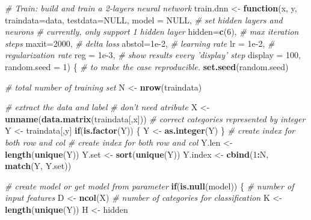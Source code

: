 \documentclass[]{book}
\newenvironment{Shaded}{\begin{snugshade}}{\end{snugshade}}
\newcommand{\CommentTok}[1]{\textcolor[rgb]{0.56,0.35,0.01}{\textit{#1}}}
\newcommand{\ControlFlowTok}[1]{\textcolor[rgb]{0.13,0.29,0.53}{\textbf{#1}}}
\newcommand{\DataTypeTok}[1]{\textcolor[rgb]{0.13,0.29,0.53}{#1}}
\newcommand{\DecValTok}[1]{\textcolor[rgb]{0.00,0.00,0.81}{#1}}
\newcommand{\FloatTok}[1]{\textcolor[rgb]{0.00,0.00,0.81}{#1}}
\newcommand{\KeywordTok}[1]{\textcolor[rgb]{0.13,0.29,0.53}{\textbf{#1}}}
\newcommand{\NormalTok}[1]{#1}
\newcommand{\OperatorTok}[1]{\textcolor[rgb]{0.81,0.36,0.00}{\textbf{#1}}}
\newcommand{\OtherTok}[1]{\textcolor[rgb]{0.56,0.35,0.01}{#1}}
\newcommand{\StringTok}[1]{\textcolor[rgb]{0.31,0.60,0.02}{#1}}
\begin{document}
\begin{Shaded}
\begin{Highlighting}[]
{{\CommentTok{# Train: build and train a 2-layers neural network }
\NormalTok{train.dnn <-}\StringTok{ }\ControlFlowTok{function}\NormalTok{(x, y, }\DataTypeTok{traindata=}\NormalTok{data, }\DataTypeTok{testdata=}\OtherTok{NULL}\NormalTok{,}
                  \DataTypeTok{model =} \OtherTok{NULL}\NormalTok{,}
                  \CommentTok{# set hidden layers and neurons}
                  \CommentTok{# currently, only support 1 hidden layer}
                  \DataTypeTok{hidden=}\KeywordTok{c}\NormalTok{(}\DecValTok{6}\NormalTok{), }
                  \CommentTok{# max iteration steps}
                  \DataTypeTok{maxit=}\DecValTok{2000}\NormalTok{,}
                  \CommentTok{# delta loss }
                  \DataTypeTok{abstol=}\FloatTok{1e-2}\NormalTok{,}
                  \CommentTok{# learning rate}
                  \DataTypeTok{lr =} \FloatTok{1e-2}\NormalTok{,}
                  \CommentTok{# regularization rate}
                  \DataTypeTok{reg =} \FloatTok{1e-3}\NormalTok{,}
                  \CommentTok{# show results every 'display' step}
                  \DataTypeTok{display =} \DecValTok{100}\NormalTok{,}
                  \DataTypeTok{random.seed =} \DecValTok{1}\NormalTok{)}
\NormalTok{\{}
  \CommentTok{# to make the case reproducible.}
  \KeywordTok{set.seed}\NormalTok{(random.seed)}
  
  \CommentTok{# total number of training set}
\NormalTok{  N <-}\StringTok{ }\KeywordTok{nrow}\NormalTok{(traindata)}
  
  \CommentTok{# extract the data and label}
  \CommentTok{# don't need atribute }
\NormalTok{  X <-}\StringTok{ }\KeywordTok{unname}\NormalTok{(}\KeywordTok{data.matrix}\NormalTok{(traindata[,x]))}
  \CommentTok{# correct categories represented by integer }
\NormalTok{  Y <-}\StringTok{ }\NormalTok{traindata[,y]}
  \ControlFlowTok{if}\NormalTok{(}\KeywordTok{is.factor}\NormalTok{(Y)) \{ Y <-}\StringTok{ }\KeywordTok{as.integer}\NormalTok{(Y) \}}
  \CommentTok{# create index for both row and col}
  \CommentTok{# create index for both row and col}
\NormalTok{  Y.len   <-}\StringTok{ }\KeywordTok{length}\NormalTok{(}\KeywordTok{unique}\NormalTok{(Y))}
\NormalTok{  Y.set   <-}\StringTok{ }\KeywordTok{sort}\NormalTok{(}\KeywordTok{unique}\NormalTok{(Y))}
\NormalTok{  Y.index <-}\StringTok{ }\KeywordTok{cbind}\NormalTok{(}\DecValTok{1}\OperatorTok{:}\NormalTok{N, }\KeywordTok{match}\NormalTok{(Y, Y.set))}

  \CommentTok{# create model or get model from parameter}
  \ControlFlowTok{if}\NormalTok{(}\KeywordTok{is.null}\NormalTok{(model)) \{}
       \CommentTok{# number of input features}
\NormalTok{       D <-}\StringTok{ }\KeywordTok{ncol}\NormalTok{(X)}
       \CommentTok{# number of categories for classification}
\NormalTok{       K <-}\StringTok{ }\KeywordTok{length}\NormalTok{(}\KeywordTok{unique}\NormalTok{(Y))}
\NormalTok{       H <-}\StringTok{  }\NormalTok{hidden}
  
}}
\end{Highlighting}
\end{Shaded}
\end{document}

